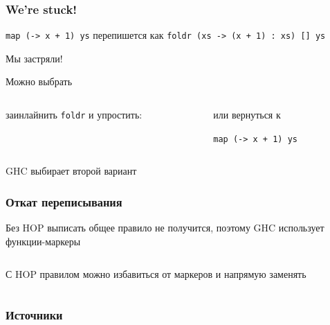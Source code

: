 \documentclass[
    aspectratio=169,
]{beamer}
\begin{document}
\begin{frame}
    \frametitle{We're stuck!}

    \texttt{map (\x -> x + 1) ys} перепишется как \texttt{foldr (\x xs -> (x + 1) : xs) [] ys}

    \vspace{1em}
    \alert{Мы застряли!}

    \vspace{1em}
    Можно выбрать

    \begin{columns}[T]
        \begin{column}{0.49\textwidth}
            заинлайнить \texttt{foldr} и упростить:
            \inputminted[firstline=108, lastline=110]{haskell}{Code.hs}
        \end{column}
        \begin{column}{0.48\textwidth}
            или вернуться к

            \texttt{map (\x -> x + 1) ys}
        \end{column}
    \end{columns}


    \vspace{1em}
    GHC выбирает второй вариант
\end{frame}

\begin{frame}
    \frametitle{Откат переписывания}

    Без HOP выписать общее правило не получится, поэтому GHC использует функции-маркеры
    \inputminted[firstline=192, lastline=196]{text}{Code.hs}

    \vspace{1em}
    С HOP правилом можно избавиться от маркеров и напрямую заменять
    \inputminted[firstline=198, lastline=199]{text}{Code.hs}
\end{frame}

\appendix
\begin{frame}
    \frametitle{Источники}
    \printbibliography[heading=none]
\end{frame}
\end{document}
